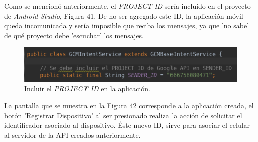 Como se mencionó anteriormente, el \textit{PROJECT ID} sería incluido en el proyecto de \textit{Android Studio}, Figura 41. De no ser agregado este ID, la aplicación móvil queda incomunicada y sería imposible que reciba los mensajes, ya que 'no sabe' de qué proyecto debe 'escuchar' los mensajes.\\

\begin{figure}[H]
\centering
\includegraphics[scale=0.70]{images/capitulo5/idProyecto.png}
\caption{Incluir el \textit{PROJECT ID} en la aplicación.}
\label{idProyecto}
\end{figure}

La pantalla que se muestra en la Figura 42 corresponde a la aplicación creada, el botón 'Registrar Dispositivo' al ser presionado realiza la acción de solicitar el identificador asociado al dispositivo. Éste nuevo ID, sirve para asociar el celular al servidor de la API creados anteriormente. \\

